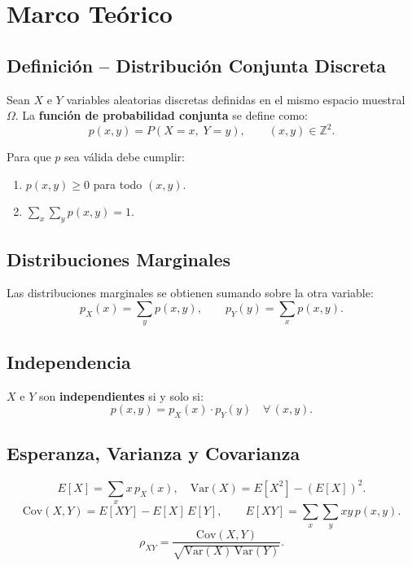 \documentclass[12pt,a4paper]{article}
\begin{document}
\section{Marco Teórico}
 
\subsection{Definición – Distribución Conjunta Discreta}
 
Sean $X$ e $Y$ variables aleatorias discretas definidas en el mismo espacio
muestral $\Omega$.  La \textbf{función de probabilidad conjunta} se define
como:
\[
  p(x,y) = P(X = x,\; Y = y), \qquad (x,y)\in\mathbb{Z}^{2}.
\]
 
Para que $p$ sea válida debe cumplir:
\begin{enumerate}
  \item $p(x,y)\geq 0$ para todo $(x,y)$.
  \item $\displaystyle\sum_{x}\sum_{y} p(x,y) = 1$.
\end{enumerate}
 
\subsection{Distribuciones Marginales}
 
Las distribuciones marginales se obtienen sumando sobre la otra variable:
\[
  p_X(x) = \sum_{y} p(x,y), \qquad
  p_Y(y) = \sum_{x} p(x,y).
\]
 
\subsection{Independencia}
 
$X$ e $Y$ son \textbf{independientes} si y solo si:
\[
  p(x,y) = p_X(x)\cdot p_Y(y) \quad \forall\,(x,y).
\]
 
\subsection{Esperanza, Varianza y Covarianza}
 
\[
  E[X] = \sum_{x} x\,p_X(x), \quad
  \text{Var}(X) = E[X^2] - (E[X])^2.
\]
\[
  \text{Cov}(X,Y) = E[XY] - E[X]\,E[Y], \qquad
  E[XY] = \sum_{x}\sum_{y} xy\,p(x,y).
\]
\[
  \rho_{XY} = \frac{\text{Cov}(X,Y)}{\sqrt{\text{Var}(X)\,\text{Var}(Y)}}.
\]
 
\end{document}
